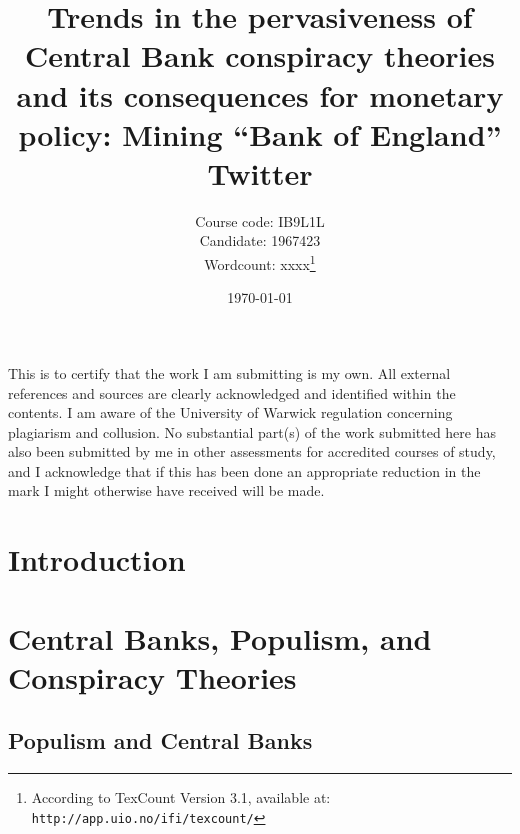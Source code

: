\documentclass[11pt]{article}
\title{Trends in the pervasiveness of Central Bank conspiracy theories and its consequences for monetary policy: Mining ``Bank of England'' Twitter}
\author{Course code: IB9L1L\\
	    Candidate: 1967423\\
	    Wordcount: xxxx\footnote{According to TexCount Version 3.1, available at: \texttt{http://app.uio.no/ifi/texcount/}}}
\date{\today}
\begin{document}
\begin{titlepage}
	\centering
	\maketitle
{} 

\vspace{1in}

This is to certify that the work I am submitting is my own. All external references and sources are clearly acknowledged and identified within the contents. I am aware of the University of Warwick regulation concerning plagiarism and collusion.
No substantial part(s) of the work submitted here has also been submitted by me in other assessments for accredited courses of study, and I acknowledge that if this has been done an appropriate reduction in the mark I might otherwise have received will be made.
	
	\end{titlepage}
	
\section{Introduction} \label{Section: Introduction}

\section{Central Banks, Populism, and Conspiracy Theories} \label{Section: Central Banks, Populism, and Conspiracy Theories}

\subsection{Populism and Central Banks}
\end{document}
